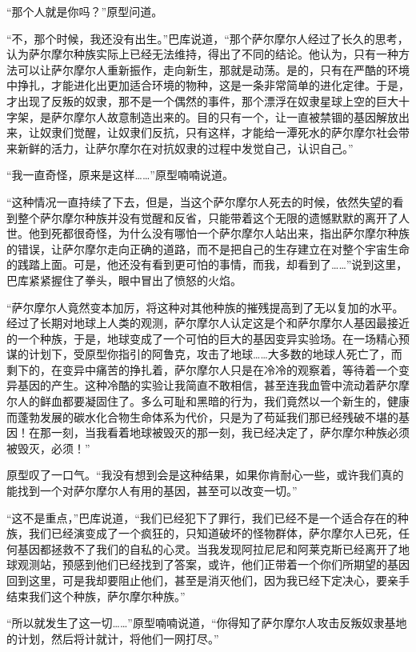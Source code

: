 “那个人就是你吗？”原型问道。 

“不，那个时候，我还没有出生。”巴库说道，“那个萨尔摩尔人经过了长久的思考，认为萨尔摩尔种族实际上已经无法维持，得出了不同的结论。他认为，只有一种方法可以让萨尔摩尔人重新振作，走向新生，那就是动荡。是的，只有在严酷的环境中挣扎，才能进化出更加适合环境的物种，这是一条非常简单的进化定律。于是，才出现了反叛的奴隶，那不是一个偶然的事件，那个漂浮在奴隶星球上空的巨大十字架，是萨尔摩尔人故意制造出来的。目的只有一个，让一直被禁锢的基因解放出来，让奴隶们觉醒，让奴隶们反抗，只有这样，才能给一潭死水的萨尔摩尔社会带来新鲜的活力，让萨尔摩尔在对抗奴隶的过程中发觉自己，认识自己。” 

“我一直奇怪，原来是这样……”原型喃喃说道。 

“这种情况一直持续了下去，但是，当这个萨尔摩尔人死去的时候，依然失望的看到整个萨尔摩尔种族并没有觉醒和反省，只能带着这个无限的遗憾默默的离开了人世。他到死都很奇怪，为什么没有哪怕一个萨尔摩尔人站出来，指出萨尔摩尔种族的错误，让萨尔摩尔走向正确的道路，而不是把自己的生存建立在对整个宇宙生命的践踏上面。可是，他还没有看到更可怕的事情，而我，却看到了……”说到这里，巴库紧紧握住了拳头，眼中冒出了愤怒的火焰。 

“萨尔摩尔人竟然变本加厉，将这种对其他种族的摧残提高到了无以复加的水平。经过了长期对地球上人类的观测，萨尔摩尔人认定这是个和萨尔摩尔人基因最接近的一个种族，于是，地球变成了一个可怕的巨大的基因变异实验场。在一场精心预谋的计划下，受原型你指引的阿鲁克，攻击了地球……大多数的地球人死亡了，而剩下的，在变异中痛苦的挣扎着，萨尔摩尔人只是在冷冷的观察着，等待着一个变异基因的产生。这种冷酷的实验让我简直不敢相信，甚至连我血管中流动着萨尔摩尔人的鲜血都要凝固住了。多么可耻和黑暗的行为，我们竟然以一个新生的，健康而蓬勃发展的碳水化合物生命体系为代价，只是为了苟延我们那已经残破不堪的基因！在那一刻，当我看着地球被毁灭的那一刻，我已经决定了，萨尔摩尔种族必须被毁灭，必须！” 

原型叹了一口气。“我没有想到会是这种结果，如果你肯耐心一些，或许我们真的能找到一个对萨尔摩尔人有用的基因，甚至可以改变一切。” 

“这不是重点，”巴库说道，“我们已经犯下了罪行，我们已经不是一个适合存在的种族，我们已经演变成了一个疯狂的，只知道破坏的怪物群体，萨尔摩尔人已死，任何基因都拯救不了我们的自私的心灵。当我发现阿拉尼尼和阿莱克斯已经离开了地球观测站，预感到他们已经找到了答案，或许，他们正带着一个你们所期望的基因回到这里，可是我却要阻止他们，甚至是消灭他们，因为我已经下定决心，要亲手结束我们这个种族，萨尔摩尔种族。” 

“所以就发生了这一切……”原型喃喃说道，“你得知了萨尔摩尔人攻击反叛奴隶基地的计划，然后将计就计，将他们一网打尽。” 

